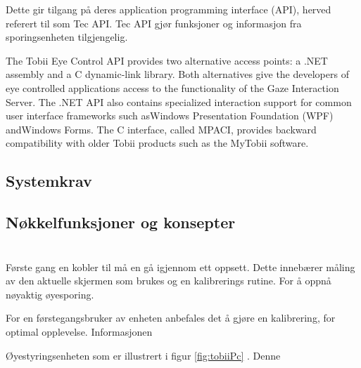 \documentclass[phd,tocprelim]{cornell}
\begin{document}
Dette gir tilgang på deres application programming interface (API), herved referert til som Tec API. Tec API gjør funksjoner og informasjon fra sporingsenheten tilgjengelig. 


The Tobii Eye Control API provides two alternative access points: a .NET assembly and a C dynamic-link library. Both alternatives
give the developers of eye controlled applications access to the functionality of the Gaze Interaction Server. The .NET API also
contains specialized interaction support for common user interface frameworks such asWindows Presentation Foundation
(WPF) andWindows Forms. The C interface, called MPACI, provides backward compatibility with older Tobii products such as
the MyTobii software.




\subsection{Systemkrav}

\subsection{Nøkkelfunksjoner og konsepter}

\section{}



Første gang en kobler til må en gå igjennom ett oppsett. Dette innebærer måling av den aktuelle skjermen som brukes og en kalibrerings rutine. For å oppnå nøyaktig øyesporing.  

For en førstegangsbruker av enheten anbefales det å gjøre en kalibrering, for optimal opplevelse. Informasjonen


Øyestyringsenheten som er illustrert i figur \ref{fig:tobiiPc}  . Denne




\medskip


\end{document}
